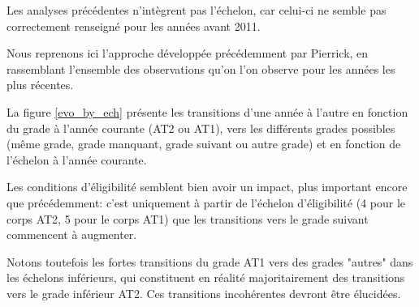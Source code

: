 \documentclass[11pt,a4paper]{article}
\begin{document}
Les analyses précédentes n'intègrent pas l'échelon, car celui-ci ne semble pas correctement renseigné pour les années avant 2011.

Nous reprenons ici l'approche développée précédemment par Pierrick, en rassemblant l'ensemble des observations qu'on l'on observe pour les années les plus récentes. 

La figure \ref{evo_by_ech} présente les transitions d'une année à l'autre en fonction du grade à l'année courante (AT2 ou AT1), vers les différents grades possibles (même grade, grade manquant, grade suivant ou autre grade) et en fonction de l'échelon à l'année courante. 

Les conditions d'éligibilité semblent bien avoir un impact, plus important encore que précédemment: c'est uniquement à partir de l'échelon d'éligibilité (4 pour le corps AT2, 5 pour le corps AT1) que les transitions vers le grade suivant commencent à augmenter.  

Notons toutefois les fortes transitions du grade AT1 vers des grades "autres" dans les échelons inférieurs, qui constituent en réalité majoritairement des transitions vers le grade inférieur AT2. Ces transitions incohérentes devront être élucidées. 

\bigskip
\end{document}

